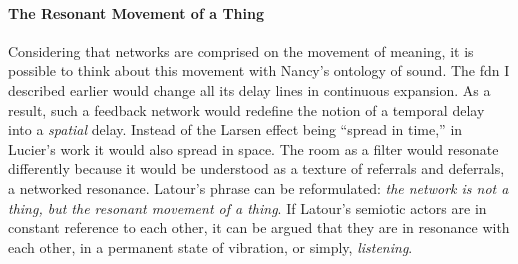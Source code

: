 \paragraph{The Resonant Movement of a Thing}
Considering that networks are comprised on the movement of meaning, it is possible to think about this movement with Nancy's ontology of sound. The \gls{fdn} I described earlier would change all its delay lines in continuous expansion. As a result, such a feedback network would redefine the notion of a temporal delay into a \textit{spatial} delay. Instead of the Larsen effect being ``spread in time,'' in Lucier's work it would also spread in space. The room as a filter would resonate differently because it would be understood as a texture of referrals and deferrals, a networked resonance. Latour's phrase can be reformulated: \textit{the network is not a thing, but the resonant movement of a thing}. If Latour's semiotic actors are in constant reference to each other, it can be argued that they are in resonance with each other, in a permanent state of vibration, or simply, \textit{listening}.

